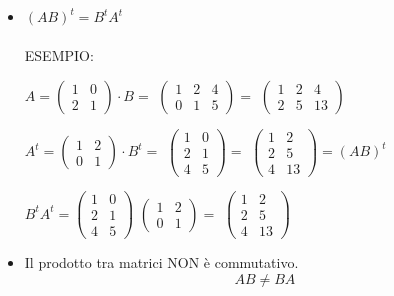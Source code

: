 \documentclass[12pt]{article}
\begin{document}
\begin{itemize}
\item $(AB)^t = B^tA^t$\\\\
ESEMPIO:
\begin{center}
    $A = \begin{pmatrix}
        1 & 0\\
        2 & 1
    \end{pmatrix} \cdot B = $
    $\begin{pmatrix}
        1 & 2 & 4\\
        0 & 1 & 5
    \end{pmatrix} = $
    $\begin{pmatrix}
        1 & 2 & 4\\
        2 & 5 & 13
    \end{pmatrix}$
\end{center}
\begin{center}
    $A^t = \begin{pmatrix}
        1 & 2\\
        0 & 1
    \end{pmatrix} \cdot B^t = $
    $\begin{pmatrix}
        1 & 0\\
        2 & 1\\
        4 & 5
    \end{pmatrix} = $
    $\begin{pmatrix}
        1 & 2\\
        2 & 5\\
        4 & 13
    \end{pmatrix} = (AB)^t$
\end{center}

\begin{center}
    $B^tA^t = \begin{pmatrix}
        1 & 0\\
        2 & 1\\
        4 & 5
    \end{pmatrix}$
    $\begin{pmatrix}
        1 & 2\\
        0 & 1
    \end{pmatrix} = $
    $\begin{pmatrix}
        1 & 2\\
        2 & 5\\
        4 & 13
    \end{pmatrix}$
\end{center}

\item Il prodotto tra matrici NON è commutativo.
\[AB \neq BA\]
\end{itemize}
\end{document}
